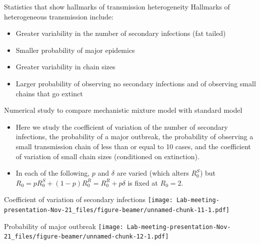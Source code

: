 \documentclass[
  ignorenonframetext,
]{beamer}
\begin{document}
\begin{frame}{Statistics that show hallmarks of transmission
heterogeneity}
\protect\hypertarget{statistics-that-show-hallmarks-of-transmission-heterogeneity}{}
Hallmarks of heterogeneous transmission include:

\begin{itemize}
\item Greater variability in the number of secondary infections (fat tailed)
\item Smaller probability of major epidemics
\item Greater variability in chain sizes
\item Larger probability of observing no secondary infections and of observing small chains that go extinct
\end{itemize}
\end{frame}

\begin{frame}{Numerical study to compare mechanistic mixture model with
standard model}
\protect\hypertarget{numerical-study-to-compare-mechanistic-mixture-model-with-standard-model}{}
\begin{itemize}
\item
  Here we study the coefficient of variation of the number of secondary
  infections, the probability of a major outbreak, the probability of
  observing a small transmission chain of less than or equal to 10
  cases, and the coefficient of variation of small chain sizes
  (conditioned on extinction).
\item
  In each of the following, \(p\) and \(\delta\) are varied (which
  alters \(R_0^S\)) but
  \(R_0 = p R_0^S + (1-p) R_0^R= R_0^R + p \delta\) is fixed at
  \(R_0 =2\).
\end{itemize}
\end{frame}

\begin{frame}{Coefficient of variation of secondary infections}
\protect\hypertarget{coefficient-of-variation-of-secondary-infections}{}
\texttt{[image: Lab-meeting-presentation-Nov-21\_files/figure-beamer/unnamed-chunk-11-1.pdf]}
\end{frame}

\begin{frame}{Probability of major outbreak}
\protect\hypertarget{probability-of-major-outbreak}{}
\texttt{[image: Lab-meeting-presentation-Nov-21\_files/figure-beamer/unnamed-chunk-12-1.pdf]}
\end{frame}
\end{document}
